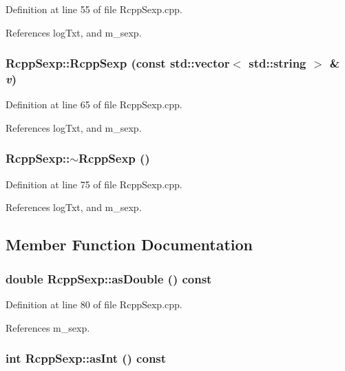 Definition at line 55 of file RcppSexp.cpp.

References logTxt, and m\_\-sexp.\hypertarget{classRcppSexp_a72d7ac372a23dcb2d8e7752afc7f07ac}{
\subsubsection[{RcppSexp}]{\setlength{\rightskip}{0pt plus 5cm}RcppSexp::RcppSexp (const std::vector$<$ std::string $>$ \& {\em v})}}
\label{classRcppSexp_a72d7ac372a23dcb2d8e7752afc7f07ac}


Definition at line 65 of file RcppSexp.cpp.

References logTxt, and m\_\-sexp.\hypertarget{classRcppSexp_a54cb551beed3570ca0a1aa0566d512cf}{
\subsubsection[{$\sim$RcppSexp}]{\setlength{\rightskip}{0pt plus 5cm}RcppSexp::$\sim$RcppSexp ()}}
\label{classRcppSexp_a54cb551beed3570ca0a1aa0566d512cf}


Definition at line 75 of file RcppSexp.cpp.

References logTxt, and m\_\-sexp.

\subsection{Member Function Documentation}
\hypertarget{classRcppSexp_a418a55a88fe2161d2bce11dbe1d49153}{
\subsubsection[{asDouble}]{\setlength{\rightskip}{0pt plus 5cm}double RcppSexp::asDouble () const}}
\label{classRcppSexp_a418a55a88fe2161d2bce11dbe1d49153}


Definition at line 80 of file RcppSexp.cpp.

References m\_\-sexp.\hypertarget{classRcppSexp_abf1d0f9b957e14e1ed3846eac93c7ccd}{
\subsubsection[{asInt}]{\setlength{\rightskip}{0pt plus 5cm}int RcppSexp::asInt () const}}
\label{classRcppSexp_abf1d0f9b957e14e1ed3846eac93c7ccd}


